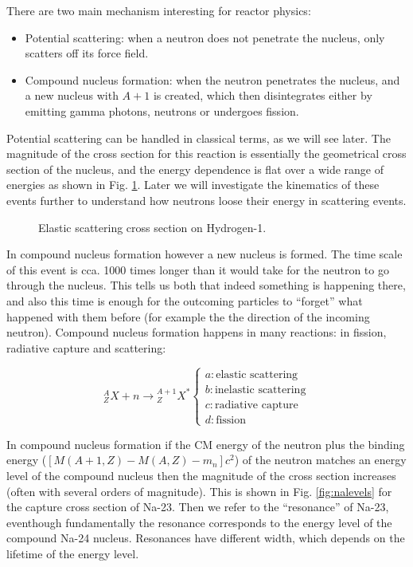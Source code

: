 There are two main mechanism interesting for reactor physics:

\begin{itemize}
\item Potential scattering: when a neutron does not penetrate the nucleus, only scatters off its force field.
\item Compound nucleus formation: when the neutron penetrates the nucleus, and a new nucleus with $A+1$ is created, which then disintegrates either by emitting gamma photons, neutrons or undergoes fission.
\end{itemize}

Potential scattering can be handled in classical terms, as we will see later. The magnitude of the cross section for this reaction is essentially the geometrical cross section of the nucleus, and the energy dependence is flat over a wide range of energies as shown in Fig. \ref{fig:h1scatter}. Later we will investigate the kinematics of these events further to understand how neutrons loose their energy in scattering events.

\begin{figure}[ht!]
\protect {}\protect
\caption{\label{fig:h1scatter} \footnotesize{Elastic scattering cross section on Hydrogen-1.}}
\end{figure}

In compound nucleus formation however a new nucleus is formed. The time scale of this event is cca. 1000 times longer than it would take for the neutron to go through the nucleus. This tells us both that indeed something is happening there, and also this time is enough for the outcoming particles to ``forget'' what happened with them before (for example the the direction of the incoming neutron). Compound nucleus formation happens in many reactions: in fission, radiative capture and scattering:

\begin{equation}
    {}_Z^AX + n \rightarrow {}_Z^{A+1}X^*
    \begin{cases}
      a: \text{elastic scattering} \\
      b: \text{inelastic scattering} \\
      c: \text{radiative capture} \\
      d: \text{fission}
    \end{cases}
\end{equation}
    
In compound nucleus formation if the CM energy of the neutron plus the binding energy ($[M(A+1,Z)-M(A,Z)-m_n]c^2$) of the neutron matches an energy level of the compound nucleus then the magnitude of the cross section increases (often with several orders of magnitude). This is shown in Fig. \ref{fig:nalevels} for the capture cross section of Na-23. Then we refer to the ``resonance'' of Na-23, eventhough fundamentally the resonance corresponds to the energy level of the compound Na-24 nucleus. Resonances have different width, which depends on the lifetime of the energy level.

